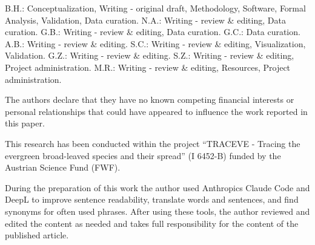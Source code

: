 \documentclass[essd, manuscript]{copernicus}
\begin{document}







\authorcontribution{} %

B.H.: Conceptualization, Writing - original draft, Methodology, Software, Formal Analysis, Validation, Data curation. N.A.: Writing - review \& editing, Data curation. G.B.: Writing - review \& editing, Data curation. G.C.: Data curation. A.B.: Writing - review \& editing. S.C.: Writing - review \& editing, Visualization, Validation. G.Z.: Writing - review \& editing. S.Z.: Writing - review \& editing, Project administration. M.R.: Writing - review \& editing, Resources, Project administration.

\competinginterests{} %
The authors declare that they have no known competing financial interests or personal relationships that could have appeared to influence the work reported in this paper.

\begin{acknowledgements}
This research has been conducted within the project “TRACEVE - Tracing the evergreen broad-leaved species and their spread” (I 6452-B) funded by the Austrian Science Fund (FWF).

During the preparation of this work the author used Anthropics Claude Code and DeepL to improve sentence readability, translate words and sentences, and find synonyms for often used phrases. After using these tools, the  author reviewed and edited the content as needed and takes full responsibility for the content of the published article.
\end{acknowledgements}
\end{document}
